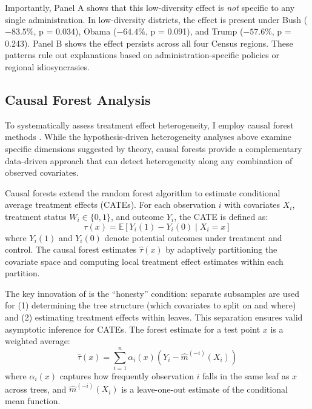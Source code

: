 \documentclass[12pt,letterpaper,oneside]{book}
\begin{document}
Importantly, Panel A shows that this low-diversity effect is \emph{not} specific to any single administration. In low-diversity districts, the effect is present under Bush ($-83.5\%$, p = 0.034), Obama ($-64.4\%$, p = 0.091), and Trump ($-57.6\%$, p = 0.243). Panel B shows the effect persists across all four Census regions. These patterns rule out explanations based on administration-specific policies or regional idiosyncrasies.

\subsection{Causal Forest Analysis}

To systematically assess treatment effect heterogeneity, I employ causal forest methods \citep{wager2018estimation, athey2016recursive}. While the hypothesis-driven heterogeneity analyses above examine specific dimensions suggested by theory, causal forests provide a complementary data-driven approach that can detect heterogeneity along any combination of observed covariates.

Causal forests extend the random forest algorithm to estimate conditional average treatment effects (CATEs). For each observation $i$ with covariates $X_i$, treatment status $W_i \in \{0,1\}$, and outcome $Y_i$, the CATE is defined as:
\begin{equation}
\tau(x) = \mathbb{E}[Y_i(1) - Y_i(0) \mid X_i = x]
\end{equation}
where $Y_i(1)$ and $Y_i(0)$ denote potential outcomes under treatment and control. The causal forest estimates $\hat{\tau}(x)$ by adaptively partitioning the covariate space and computing local treatment effect estimates within each partition.

The key innovation of \cite{wager2018estimation} is the ``honesty'' condition: separate subsamples are used for (1) determining the tree structure (which covariates to split on and where) and (2) estimating treatment effects within leaves. This separation ensures valid asymptotic inference for CATEs. The forest estimate for a test point $x$ is a weighted average:
\begin{equation}
\hat{\tau}(x) = \sum_{i=1}^{n} \alpha_i(x) \left( Y_i - \hat{m}^{(-i)}(X_i) \right)
\end{equation}
where $\alpha_i(x)$ captures how frequently observation $i$ falls in the same leaf as $x$ across trees, and $\hat{m}^{(-i)}(X_i)$ is a leave-one-out estimate of the conditional mean function.
\end{document}
